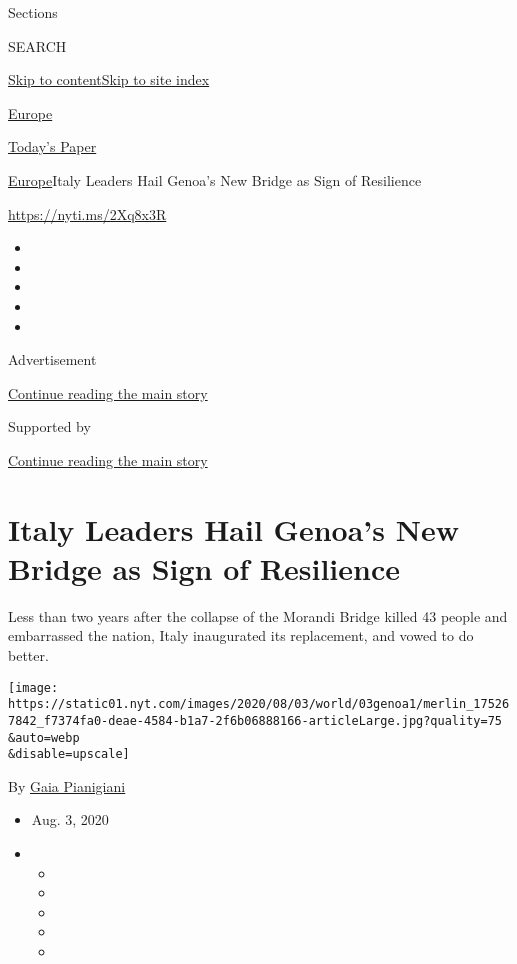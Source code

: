 Sections

SEARCH

\protect\hyperlink{site-content}{Skip to
content}\protect\hyperlink{site-index}{Skip to site index}

\href{https://www.nytimes.com/section/world/europe}{Europe}

\href{https://myaccount.nytimes.com/auth/login?response_type=cookie\&client_id=vi}{}

\href{https://www.nytimes.com/section/todayspaper}{Today's Paper}

\href{/section/world/europe}{Europe}\textbar{}Italy Leaders Hail Genoa's
New Bridge as Sign of Resilience

\url{https://nyti.ms/2Xq8x3R}

\begin{itemize}
\item
\item
\item
\item
\item
\end{itemize}

Advertisement

\protect\hyperlink{after-top}{Continue reading the main story}

Supported by

\protect\hyperlink{after-sponsor}{Continue reading the main story}

\hypertarget{italy-leaders-hail-genoas-new-bridge-as-sign-of-resilience}{%
\section{Italy Leaders Hail Genoa's New Bridge as Sign of
Resilience}\label{italy-leaders-hail-genoas-new-bridge-as-sign-of-resilience}}

Less than two years after the collapse of the Morandi Bridge killed 43
people and embarrassed the nation, Italy inaugurated its replacement,
and vowed to do better.

\texttt{[image: https://static01.nyt.com/images/2020/08/03/world/03genoa1/merlin\_175267842\_f7374fa0-deae-4584-b1a7-2f6b06888166-articleLarge.jpg?quality=75\\\&auto=webp\\\&disable=upscale]}

By \href{https://www.nytimes.com/by/gaia-pianigiani}{Gaia Pianigiani}

\begin{itemize}
\item
  Aug. 3, 2020
\item
  \begin{itemize}
  \item
  \item
  \item
  \item
  \item
  \end{itemize}
\end{itemize}

